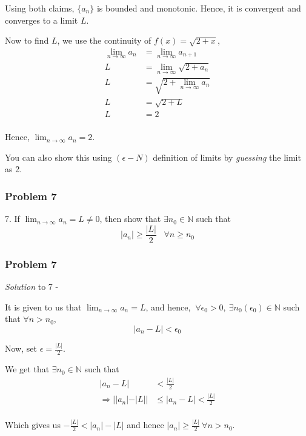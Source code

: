 \documentclass[
	11pt, %
]{beamer}
\begin{document}
\begin{frame}[t]
	Using both claims, $\{a_n\}$ is bounded and monotonic. Hence, it is convergent and converges to a limit $L$.

	\medskip

	Now to find $L$, we use the continuity of $f(x) = \sqrt{2+x}$,
	\begin{align*}
		\lim_{n \to \infty} a_n &= \lim_{n \to \infty} a_{n+1} \\
		L &= \lim_{n \to \infty} \sqrt{2 + a_n} \\
		L &= \sqrt{2 + \lim_{n \to \infty} a_n} \\
		L &= \sqrt{2 + L} \\
		L &= 2 \\
	\end{align*}

	Hence, $\lim_{n \to \infty} a_n = 2$.

	\medskip

	You can also show this using $(\epsilon-N)$ definition of limits by \textit{guessing} the limit as 2.


\end{frame}
\begin{frame}
	\frametitle{Problem 7}
	
	\begin{block}{7.}
		If $\lim _{n \to \infty} a_n = L \neq 0$, then show that $\exists n_0 \in \mathbb{N}$ such that
		\[|a_n| \geq \frac{|L|}{2} \hspace{10pt} \forall n \geq n_0\]
	\end{block}
	
\end{frame}

\begin{frame}[t]
	\frametitle{Problem 7}

	\textit{Solution} to 7 -

	\bigskip
	
	It is given to us that $\lim _{n \to \infty} a_n = L$, and hence, $~ \forall \epsilon_0 > 0, ~ \exists n_0(\epsilon_0) \in \mathbb{N}$ such that $\forall n > n_0$, 
	\[ \left | a_{n} - L \right | < \epsilon_0\]

	\medskip

	Now, set $\epsilon = \frac{|L|}{2}$.

	We get that $\exists n_0 \in \mathbb{N}$ such that 
	\begin{align*}
		|a_n - L| &< \frac{|L|}{2} \\
		\Rightarrow ||a_n| - |L|| &\leq |a_n - L| < \frac{|L|}{2} \\
	\end{align*}

	Which gives us $-\frac{|L|}{2} < |a_n| - |L|$ and hence $|a_n| \geq \frac{|L|}{2} ~ \forall n > n_0$.

\end{frame}
\end{document}
